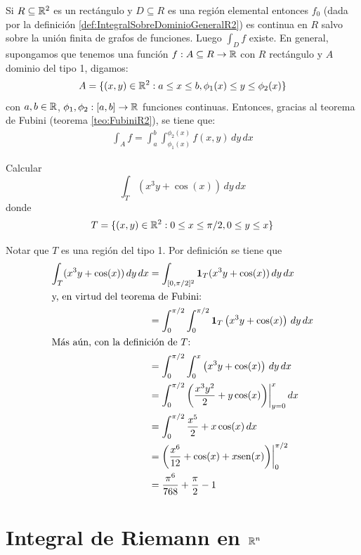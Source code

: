 Si $ R \subseteq \mathbb{R}^2 $ es un rect\'angulo y $ D \subseteq R $ es una regi\'on elemental entonces $ f_0 $ (dada por la definici\'on
\ref{def:IntegralSobreDominioGeneralR2}) es continua en $ R $ salvo sobre la uni\'on finita de grafos de funciones. Luego $ \int_D f $ existe. En general, supongamos que tenemos una funci\'on $ f: A \subseteq R \to \mathbb{R} $ con $ R $ rect\'angulo y $A$ dominio del tipo 1, digamos:
\[
    A = \{(x,y) \in \mathbb{R}^2 : a \leq x \leq b, \phi_1(x)
    \leq y \leq \phi_2(x)\}
\]
con $ a,b \in \mathbb{R}$, $ \phi_1, \phi_2:[a,b] \to \mathbb{R} $ funciones continuas. Entonces, gracias al teorema de Fubini (teorema \ref{teo:FubiniR2}), se tiene que:
\begin{align*}
    \int_A f = \int_a^b \int_{\phi_1(x)}^{\phi_2(x)} f(x,y) \, dy \,
    dx
\end{align*}

\begin{ejemplo}
Calcular
\[
    \int_T (x^3 y  + \cos(x)) \, dy \, dx
\]
donde
\[
    T = \{(x,y) \in \mathbb{R}^2 : 0 \leq x \leq \pi/2, 0 \leq y \leq x \}
\]
\begin{solucion}
Notar que $ T $ es una regi\'on del tipo 1. Por definici\'on se tiene
que
\begin{align*}
\int_T (x^3 y  + \cos(x)) \, dy \, dx
    &= \int_{[0,\pi/2]^2} \mathbf{1}_{T} (x^3 y  + \cos(x)) \, dy \, dx \\
\intertext{y, en virtud del teorema de Fubini:}
    &= \int_0^{\pi/2} \int_0^{\pi/2}
        \mathbf{1}_{T} \left(x^3 y  + \cos(x)\right) \, dy \, dx \\
\intertext{M\'as a\'un, con la definici\'on de $ T $:}
    &= \int_0^{\pi/2} \int_0^x \left(x^3 y  + \cos(x)\right) \, dy \, dx \\
    &= \int_0^{\pi/2} \left(\frac{x^3 y^2}{2} + y \cos(x)\right) \biggr |_{y=0}^x \, dx \\
    &= \int_0^{\pi/2} \frac{x^5}{2} + x \cos(x) \, dx \\
    &= \left( \frac{x^6}{12} + \cos(x) + x \text{sen}(x)\right)\biggr |_0^{\pi/2} \\
    &= \frac{\pi^6}{768} + \frac{\pi}{2} - 1
\end{align*}
\end{solucion}
\end{ejemplo}

\section{Integral de Riemann en \texorpdfstring{$\mathbb{R}^n$}{Rn}}\label{sec:RiemannRN}

